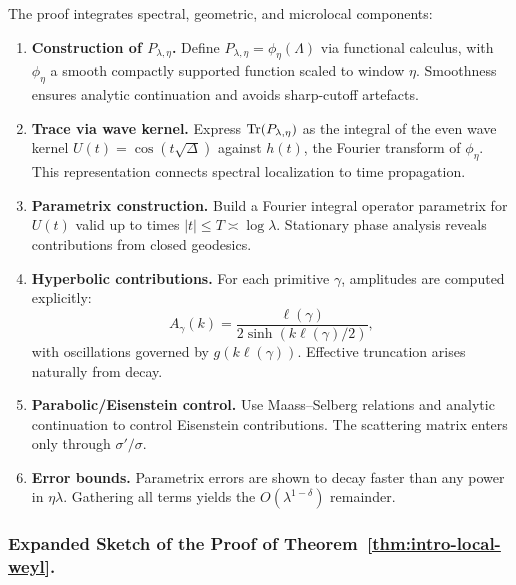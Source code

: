 The proof integrates spectral, geometric, and microlocal components:

\begin{enumerate}[label=\arabic*.]
  \item \textbf{Construction of $P_{\lambda,\eta}$.}
        Define $P_{\lambda,\eta}=\phi_\eta(\Lambda)$ via functional calculus,
        with $\phi_\eta$ a smooth compactly supported function scaled to window $\eta$.
        Smoothness ensures analytic continuation and avoids sharp-cutoff artefacts.

  \item \textbf{Trace via wave kernel.}
        Express $\operatorname{Tr}(P_{\lambda,\eta})$ as the integral of the even wave kernel
        $U(t)=\cos(t\sqrt{\Delta})$ against $h(t)$, the Fourier transform of $\phi_\eta$.
        This representation connects spectral localization to time propagation.

  \item \textbf{Parametrix construction.}
        Build a Fourier integral operator parametrix for $U(t)$
        valid up to times $|t|\le T\asymp\log\lambda$.
        Stationary phase analysis reveals contributions from closed geodesics.

  \item \textbf{Hyperbolic contributions.}
        For each primitive $\gamma$, amplitudes are computed explicitly:
        \[
          A_\gamma(k) = \frac{\ell(\gamma)}{2\sinh(k\ell(\gamma)/2)},
        \]
        with oscillations governed by $g(k\ell(\gamma))$.
        Effective truncation arises naturally from decay.

  \item \textbf{Parabolic/Eisenstein control.}
        Use Maass–Selberg relations and analytic continuation
        to control Eisenstein contributions.
        The scattering matrix enters only through $\sigma'/\sigma$.

  \item \textbf{Error bounds.}
        Parametrix errors are shown to decay faster than any power in $\eta\lambda$.
        Gathering all terms yields the $O(\lambda^{1-\delta})$ remainder.
\end{enumerate}

\subsubsection*{Expanded Sketch of the Proof of Theorem~\ref{thm:intro-local-weyl}.}

